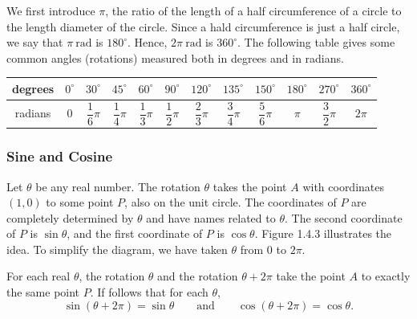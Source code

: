 \documentclass[11pt]{book}
\theoremstyle{break}
\theoremstyle{no_label}
\numberwithin{equation}{section}
\begin{document}
We first introduce $\pi$, the ratio of the length of a half circumference of a circle to the length diameter of the circle. Since a hald circumference is just a half circle, we say that $\pi\ \text{rad}$ is $180^\circ$. Hence, $2\pi\ \text{rad}$ is $360^\circ$. The following table gives some common angles (rotations) measured both in degrees and in radians.

\begin{center}
    \begin{tabular}{|cccccccccccc|}
        \hline
        degrees & $0^\circ$ & $30^\circ$ & $45^\circ$ & $60^\circ$ & $90^\circ$ & $120^\circ$ & $135^\circ$ & $150^\circ$ & $180^\circ$ & $270^\circ$ & $360^\circ$\\
        \hline
        radians & $0$ & $\dfrac{1}{6}\pi$ & $\dfrac{1}{4}\pi$ & $\dfrac{1}{3}\pi$ & $\dfrac{1}{2}\pi$ & $\dfrac{2}{3}\pi$ & $\dfrac{3}{4}\pi$ & $\dfrac{5}{6}\pi$ & $\pi$ & $\dfrac{3}{2}\pi$ & $2\pi$\\[0.2em]
        \hline
    \end{tabular}
\end{center}

\subsubsection*{Sine and Cosine}

Let $\theta$ be any real number. The rotation $\theta$ takes the point $A$ with coordinates $(1, 0)$ to some point $P$, also on the unit circle. The coordinates of $P$ are completely determined by $\theta$ and have names related to $\theta$. The second coordinate of $P$ is $\sin\theta$, and the first coordinate of $P$ is $\cos\theta$. Figure 1.4.3 illustrates the idea. To simplify the diagram, we have taken $\theta$ from $0$ to $2\pi$.

For each real $\theta$, the rotation $\theta$ and the rotation $\theta+2\pi$ take the point $A$ to exactly the same point $P$. If follows that for each $\theta$, $$\sin(\theta+2\pi)=\sin\theta\qquad\text{and}\qquad\cos(\theta+2\pi)=\cos\theta.$$
\end{document}
